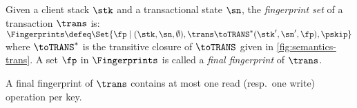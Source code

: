 
\begin{definition}
Given a client stack $\stk$ and a transactional state $\sn$, the \emph{fingerprint set} of a transaction $\trans$ is:
\(
\Fingerprints \defeq \Set{\fp \mid (\stk, \sn, \emptyset), \trans \toTRANS^* (\stk', \sn', \fp), \pskip }
\)
where $\toTRANS^*$ is the transitive closure of $\toTRANS$ given in \cref{fig:semantics-trans}.  
A set $\fp$ in $\Fingerprints$ is called a \emph{final fingerprint} of $\trans$. 
\end{definition}
\noindent 
A final fingerprint of $\trans$ contains at most one read (resp.\ one write) operation per key.

